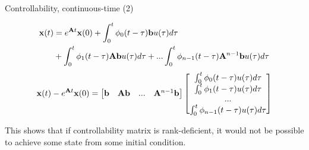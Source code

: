 \documentclass{beamer}
\begin{document}
\begin{frame}{Controllability, continuous-time (2)}
	\begin{flushleft}
		
		\begin{align*}
			\mathbf{x}(t) &= e^{\mathbf{A}t}  \mathbf{x}(0) + 
			\int_{0}^{t} \phi_0(t-\tau)\mathbf{b} u(\tau) d\tau
			\\
			&+
			\int_{0}^{t} \phi_1(t-\tau)\mathbf{A}\mathbf{b}  u(\tau) d\tau+ ... 
		    \int_{0}^{t} \phi_{n-1}(t-\tau) \mathbf{A}^{n-1} 
			\mathbf{b}  u(\tau) d\tau 
		\end{align*}
		\begin{align*}
		\mathbf{x}(t) -  e^{\mathbf{A}t}  \mathbf{x}(0) = 
		\begin{bmatrix}
			\mathbf{b} & \mathbf{A}\mathbf{b}& ... &\mathbf{A}^{n-1}\mathbf{b}
		\end{bmatrix}
		\begin{bmatrix}
			\int_{0}^{t} \phi_0(t-\tau) u(\tau) d\tau \\
			\int_{0}^{t} \phi_1(t-\tau) u(\tau) d\tau \\
			... \\
			\int_{0}^{t} \phi_{n-1}(t-\tau) u(\tau) d\tau \\
		\end{bmatrix}
		\end{align*}
		
		This shows that if controllability matrix is rank-deficient, it would not be possible to achieve some state from some initial condition.
		
	\end{flushleft}
\end{frame}
\end{document}

